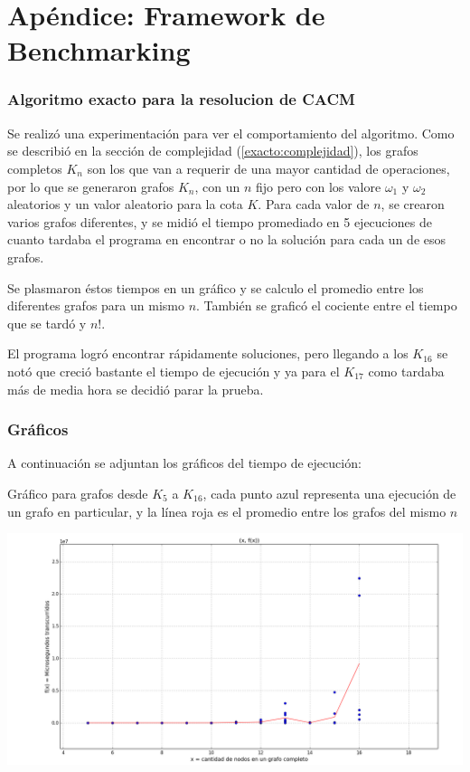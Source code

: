 \section{Ap\'endice: Framework de Benchmarking} \label{casos_de_prueba}

\subsubsection{Algoritmo exacto para la resolucion de CACM}

Se realiz\'o una experimentaci\'on para ver el comportamiento del algoritmo. Como se describi\'o en la secci\'on de complejidad (\ref{exacto:complejidad}), los grafos completos $K_n$ son los que van a requerir de una mayor cantidad de operaciones,
por lo que se generaron grafos $K_n$, con un $n$ fijo pero con los valore $\omega_1$ y $\omega_2$ aleatorios y un valor aleatorio para la cota $K$.
Para cada valor de $n$, se crearon varios grafos diferentes, y se midi\'o el tiempo promediado en 5 ejecuciones de cuanto tardaba el programa en encontrar o no la soluci\'on para cada un de esos grafos.

Se plasmaron \'estos tiempos en un gr\'afico y se calculo el promedio entre los diferentes grafos para un mismo $n$. Tambi\'en se grafic\'o el cociente entre el tiempo que se tard\'o y $n!$.

El programa logr\'o encontrar r\'apidamente soluciones, pero llegando a los $K_{16}$ se not\'o que creci\'o bastante el tiempo de ejecuci\'on y ya para el $K_{17}$ como tardaba m\'as de media hora se decidi\'o parar la prueba.

\subsubsection{Gr\'aficos}
A continuaci\'on se adjuntan los gr\'aficos del tiempo de ejecuci\'on:

Gr\'afico para grafos desde $K_5$ a $K_{16}$, cada punto azul representa una ejecuci\'on de un grafo en particular, y la l\'inea roja es el promedio entre los grafos del mismo $n$
\begin{center}
	\includegraphics[scale=0.41]{img/exacto/fx_n_todo.png}
\end{center}

